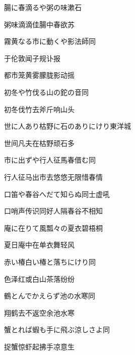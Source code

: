 \begin{haiku}
    {\FH 腸に春滴るや粥の味}\hfill{\FH 漱石}

    {\FK 粥味滴滴佳腸中春欲苏}
\end{haiku}

\begin{haiku}
    {\FH 霧黄なる市に動くや影法師}\hfill{\FH 同}

    {\FK 于伦敦闻子规讣报}

    {\FK 都市笼黄雾朦胧影动摇}
\end{haiku}

\begin{haiku}
    {\FH 初冬や竹伐る山の鉈の音}\hfill{\FH 同}

    {\FK 初冬伐竹去斧斤响山头}
\end{haiku}

\begin{haiku}
    {\FH 世に人あり枯野に石のありにけり}\hfill{\FH 東洋城}

    {\FK 世间凡夫在枯野顽石多}
\end{haiku}

\begin{haiku}
    {\FH 市に出ずや行人征馬春借む}\hfill{\FH 同}

    {\FK 行人征马出市去悠悠无限惜春情}
\end{haiku}

\begin{haiku}
    {\FH 口笛や春谷へだて知らぬ同士}\hfill{\FH 虚吼}

    {\FK 口哨声传识同好人隔春谷不相知}
\end{haiku}

\begin{haiku}
    {\FH 庵に在りて風瓢々の夏衣}\hfill{\FH 碧梧桐}

    {\FK 夏日庵中在单衣舞轻风}
\end{haiku}

\begin{haiku}
    {\FH 赤い椿白い椿と落ちにけり}\hfill{\FH 同}

    {\FK 色泽红或白山茶落纷纷}
\end{haiku}

\begin{haiku}
    {\FH 鶴とんでかえらず池の水寒}\hfill{\FH 同}

    {\FK 翔鹤去不返空余池水寒}
\end{haiku}

\begin{haiku}
    {\FH 蟹とれば蝦も手に飛ぶ涼しさよ}\hfill{\FH 同}

    {\FK 捉蟹惊虾起拂手凉意生}
\end{haiku}

